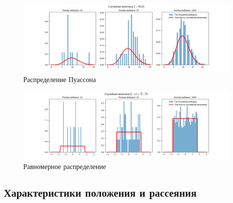 \documentclass[12pt]{article}
\begin{document}
\begin{figure}[!hbt]
  \centering
  \includegraphics[width=0.8\paperwidth ]{images/histogram/poisson.png}
  \caption{Распределение Пуассона}
\end{figure}

\begin{figure}[!hbt]
  \centering
  \includegraphics[width=0.8\paperwidth ]{images/histogram/uniform.png}
  \caption{Равномерное распределение}
\end{figure}

\FloatBarrier
\subsection{Характеристики положения и рассеяния}
\end{document}
